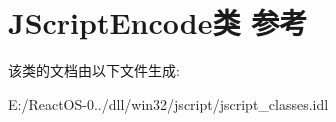 \hypertarget{class_j_script_encode}{}\section{J\+Script\+Encode类 参考}
\label{class_j_script_encode}


该类的文档由以下文件生成\+:\begin{DoxyCompactItemize}
\item 
E\+:/\+React\+O\+S-\/0../dll/win32/jscript/jscript\+\_\+classes.\+idl\end{DoxyCompactItemize}
